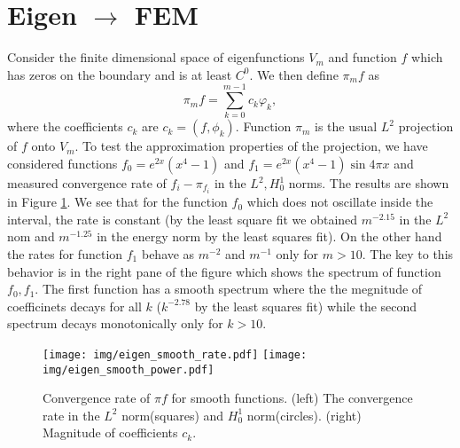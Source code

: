 \documentclass[a4paper,10pt]{article}
\newcommand{\inner}[2]{\ensuremath{\left(#1, #2\right)}}
\begin{document}
  \section{Eigen $\rightarrow$ FEM}
  Consider the finite dimensional space of eigenfunctions $V_m$ and function $f$
  which has zeros on the boundary and is at least $C^0$. We then define $\pi_m f$
  as
  \[
    \pi_m f = \displaystyle\sum\limits_{k=0}^{m-1}c_k \varphi_k,
  \]
  where the coefficients $c_k$ are $c_k=\inner{f}{\phi_k}$. Function $\pi_m$ is
  the usual $L^2$ projection of $f$ onto $V_m$. To test the approximation
  properties of the projection, we have considered functions
  $f_0=e^{2x}(x^4-1)$ and $f_1=e^{2x}(x^4-1)\sin{4\pi x}$ and measured
  convergence rate of $f_i - \pi_{f_i}$ in the $L^2, H^1_0$ norms. The results
  are shown in Figure \ref{fig:eig_smooth_projection}. We see that for the
  function $f_0$ which does not oscillate inside the interval, the rate is constant
  (by the least square fit we obtained $m^{-2.15}$ in the $L^2$ nom and $m^{-1.25}$
  in the energy norm by the least squares fit). On the other hand the rates
  for function $f_1$ behave as $m^{-2}$ and $m^{-1}$ only for $m>10$. The key
  to this behavior is in the right pane of the figure which shows the spectrum
  of function $f_0, f_1$. The first function has a smooth spectrum where the the
  megnitude of coefficinets decays for all $k$ ($k^{-2.78}$ by the least squares
  fit) while the second spectrum decays monotonically only for $k>10$.
  \begin{figure}
  \begin{center}
    \texttt{[image: img/eigen\_smooth\_rate.pdf]}
    \texttt{[image: img/eigen\_smooth\_power.pdf]}
  \end{center}
  \label{fig:eig_smooth_projection}
  \caption{Convergence rate of $\pi f$ for smooth functions. (left) The
  convergence rate in the $L^2$ norm(squares) and $H^1_0$ norm(circles). 
  (right) Magnitude of coefficients $c_k$.}
  \end{figure}
\end{document}
